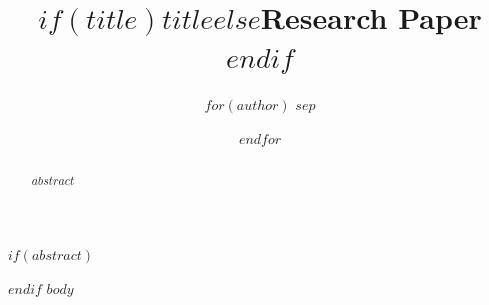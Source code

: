 \documentclass[conference]{IEEEtran}
\begin{document}
\title{$if(title)$$title$$else$Research Paper$endif$}

\author{
$for(author)$
$sep$\and 
$endfor$
}

\maketitle
$if(abstract)$
\begin{abstract}
$abstract$
\end{abstract}
$endif$
$body$
\end{document}
